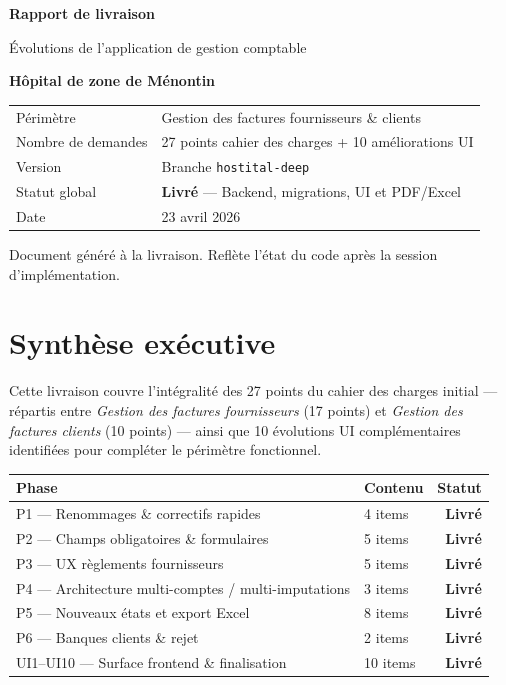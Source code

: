 \documentclass[11pt,a4paper]{article}
\newcommand{\statusOK}{\textcolor{accent}{\textbf{\checkmark{} Livré}}}
\begin{document}
\begin{titlepage}
  \centering
  \vspace*{2cm}
  {\Huge\bfseries\color{primary} Rapport de livraison\par}
  \vspace{0.6cm}
  {\Large Évolutions de l'application de gestion comptable\par}
  \vspace{0.3cm}
  {\Large\textbf{Hôpital de zone de Ménontin}\par}

  \vspace{2cm}

  \begin{tabularx}{0.8\textwidth}{@{}l X@{}}
    \toprule
    Périmètre & Gestion des factures fournisseurs \& clients \\
    Nombre de demandes & 27 points cahier des charges + 10 améliorations UI \\
    Version & Branche \texttt{hostital-deep} \\
    Statut global & \statusOK{} --- Backend, migrations, UI et PDF/Excel \\
    Date & 23 avril 2026 \\
    \bottomrule
  \end{tabularx}

  \vfill
  {\small Document généré à la livraison. Reflète l'état du code après la session d'implémentation.}
\end{titlepage}

\tableofcontents
\newpage

\section{Synthèse exécutive}

Cette livraison couvre l'intégralité des 27 points du cahier des charges
initial --- répartis entre \emph{Gestion des factures fournisseurs} (17 points)
et \emph{Gestion des factures clients} (10 points) --- ainsi que 10 évolutions
UI complémentaires identifiées pour compléter le périmètre fonctionnel.

\begin{tabular}{@{}>{\raggedright\arraybackslash}p{} l r@{}}
  \toprule
  \textbf{Phase} & \textbf{Contenu} & \textbf{Statut} \\
  \midrule
  P1 --- Renommages \& correctifs rapides & 4 items & \statusOK \\
  P2 --- Champs obligatoires \& formulaires & 5 items & \statusOK \\
  P3 --- UX règlements fournisseurs & 5 items & \statusOK \\
  P4 --- Architecture multi-comptes / multi-imputations & 3 items & \statusOK \\
  P5 --- Nouveaux états et export Excel & 8 items & \statusOK \\
  P6 --- Banques clients \& rejet & 2 items & \statusOK \\
  \midrule
  UI1--UI10 --- Surface frontend \& finalisation & 10 items & \statusOK \\
  \bottomrule
\end{tabular}
\end{document}
